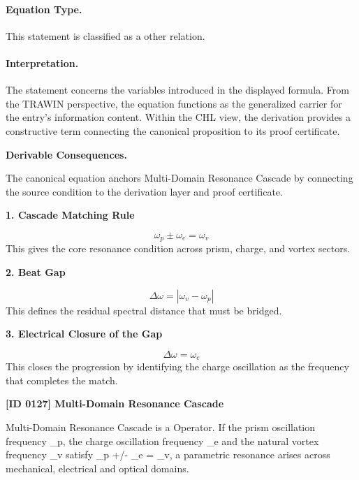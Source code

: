 \paragraph{Equation Type.}
This statement is classified as a other relation.

\paragraph{Interpretation.}
The statement concerns the variables introduced in the displayed formula. From the TRAWIN perspective, the equation functions as the generalized carrier for the entry’s information content. Within the CHL view, the derivation provides a constructive term connecting the canonical proposition to its proof certificate.

\par\vspace{0.35em}
\noindent\textbf{Derivable Consequences.}\quad
\begingroup
\footnotesize
\raggedright
The canonical equation anchors Multi-Domain Resonance Cascade by connecting the source condition to the derivation layer and proof certificate.
\par\endgroup

\noindent\textbf{1. Cascade Matching Rule}\par
\[
\omega_p \pm \omega_e = \omega_v
\]
\noindent This gives the core resonance condition across prism, charge, and vortex sectors.\par
\noindent\textbf{2. Beat Gap}\par
\[
\Delta \omega = |\omega_v - \omega_p|
\]
\noindent This defines the residual spectral distance that must be bridged.\par
\noindent\textbf{3. Electrical Closure of the Gap}\par
\[
\Delta \omega = \omega_e
\]
\noindent This closes the progression by identifying the charge oscillation as the frequency that completes the match.\par

\clearpage
\noindent\textbf{[ID 0127] Multi-Domain Resonance Cascade}\par
\vspace{0.35em}
\begingroup\small
{}
Multi-Domain Resonance Cascade is a Operator. If the prism oscillation frequency  \_p, the charge oscillation frequency  \_e and the natural vortex frequency  \_v satisfy  \_p +/-  \_e =  \_v, a parametric resonance arises across mechanical, electrical and optical domains.

